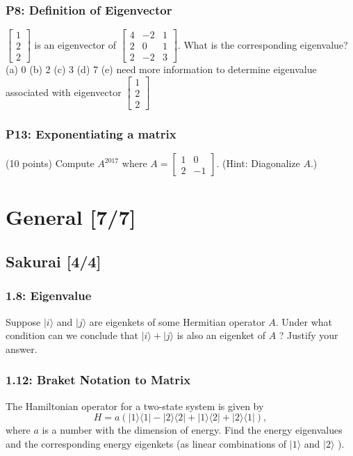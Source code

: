 \documentclass[11pt]{article}
\begin{document}
\subsubsection{P8: Definition of Eigenvector}
\label{sec:org35867ca}
 \(\left[\begin{array}{l}1 \\ 2 \\ 2\end{array}\right]\) is an eigenvector of
   \(\left[\begin{array}{rrr}4 & -2 & 1 \\ 2 & 0 & 1 \\ 2 & -2 &
   3\end{array}\right]\). What is the corresponding eigenvalue?
(a) 0
(b) 2
(c) 3
(d) 7
(e) need more information to determine eigenvalue associated with eigenvector \(\left[\begin{array}{l}1 \\ 2 \\ 2\end{array}\right]\)
\subsubsection{P13: Exponentiating a matrix}
\label{sec:org9da0f21}
(10 points) Compute \(A^{2017}\) where \(A=\left[\begin{array}{rr}1 & 0 \\ 2 &
    -1\end{array}\right]\). (Hint: Diagonalize \(A\).)
\section{General [7/7]}
\label{sec:orgc70a237}
\subsection{Sakurai [4/4]}
\label{sec:orge542ef5}
\subsubsection{1.8: Eigenvalue}
\label{sec:org278098f}
Suppose \(|i\rangle\) and \(|j\rangle\) are eigenkets of some Hermitian operator
\(A\). Under what condition can we conclude that \(|i\rangle+|j\rangle\) is also an
eigenket of \(A\) ? Justify your answer.
\subsubsection{1.12: Braket Notation to Matrix}
\label{sec:org807d333}
The Hamiltonian operator for a two-state system is given by $$
H=a(|1\rangle\langle 1|-| 2\rangle\langle 2|+| 1\rangle\langle 2|+|
2\rangle\langle 1|), $$ where \(a\) is a number with the dimension of energy. Find
the energy eigenvalues and the corresponding energy eigenkets (as linear
combinations of \(|1\rangle\) and \(|2\rangle\) ).
\end{document}
